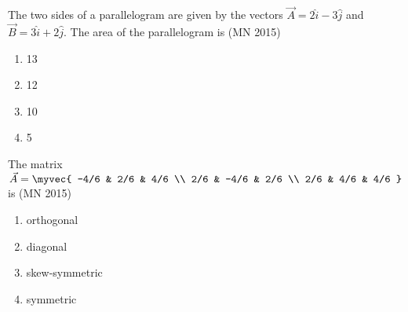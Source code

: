 \item The two sides of a parallelogram are given by the vectors $\vec{A} = 2\hat{i} - 3\hat{j}$ and $\vec{B} = 3\hat{i} + 2\hat{j}$. The area of the parallelogram is  
	\hfill(MN 2015)
\begin{multicols}{4}
\begin{enumerate}
\item 13  
\item 12  
\item 10  
\item 5  
\end{enumerate}
\end{multicols}
\item The matrix  
	$
	\vec{A}=\myvec{
-4/6 & 2/6 & 4/6 \\
2/6 & -4/6 & 2/6 \\
2/6 & 4/6 & 4/6
}
$
is  
\hfill(MN 2015)
\begin{multicols}{4}
\begin{enumerate}
\item orthogonal  
\item diagonal  
\item skew-symmetric  
\item symmetric  
\end{enumerate}
\end{multicols}

